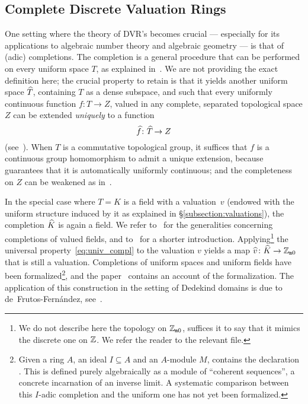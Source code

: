 \documentclass[sigplan,screen]{acmart}
\begin{document}
\subsection{Complete Discrete Valuation Rings}\label{subsec:complete_DVR}
One setting where the theory of DVR's becomes crucial --- especially for its applications to algebraic number theory and algebraic geometry --- is that of (adic) completions. The completion is a general procedure that can be performed on every uniform space $T$, as explained in~\cite[Chapitre~II, \S3]{Bou71}. We are not providing the exact definition here; the crucial property to retain is that it yields another uniform space $\compl{T}$, containing $T$ as a dense subspace, and such that every uniformly continuous function $f\colon T \to Z$, valued in any complete, separated topological space $Z$ can be extended \emph{uniquely} to a function
\begin{equation}\label{eq:univ_compl}
\compl{f}\colon\compl{T}\rightarrow Z
\end{equation}
(see~\cite[Chapitre~II, \S3, n$^\circ$6, Théorème~2]{Bou71}). When $T$ is a commutative topological group, it suffices that $f$ is a continuous group homomorphism to admit a unique extension, because \cite[Chapitre~III, \S3, n$^\circ$1, Proposition~3]{Bou71} guarantees that it is automatically uniformly continuous; and the completeness on $Z$ can be weakened as in~\cite[Chapitre~I, \S8, n$^\circ$5, Théorème~1]{Bou71}.

In the special case where $T=K$ is a field with a valuation~$v$ (endowed with the uniform structure induced by it as explained in \S\ref{subsection:valuations}), the completion $\compl{K}$ is again a field. We refer to~\cite[Chapitre~VI, \S5, n$^\circ$3]{Bou85} for the generalities concerning completions of valued fields, and to~\cite[Chapitre~II, \S1]{Ser62} for a shorter introduction. Applying\footnote{We do not describe here the topology on $\mathbb{Z}_{\mathtt{m}0}$, suffices it to say that it mimics the discrete one on $\mathbb{Z}$. We refer the reader to the relevant \mathlib file\href{https://leanprover-community.github.io/mathlib_docs/topology/algebra/with_zero_topology.html}{\extlink}.} the universal property~\eqref{eq:univ_compl} to the valuation $v$ yields a map $\compl{v}\colon \compl{K}\rightarrow \wzmZZ$ that is still a valuation. Completions of uniform spaces and uniform fields have been formalized\footnote{Given a ring $A$, an ideal $I\subseteq A$ and an $A$-module $M$, \mathlib contains the declaration . This is defined purely algebraically as a module of ``coherent sequences'', a concrete incarnation of an inverse limit. A systematic comparison between this $I$-adic completion and the uniform one has not yet been formalized.}, and the paper~\cite{BuzComMas20} contains an account of the formalization. The application of this construction in the setting of Dedekind domains is due to de~Frutos-Fernández, see~\cite{deF22}. 
\end{document}
